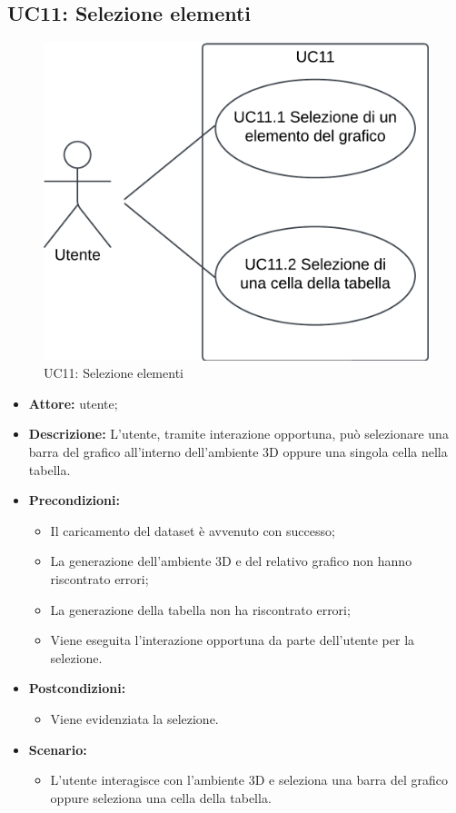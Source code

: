 \subsection{UC11: Selezione elementi}
\begin{figure}[h!]\centering
    \includegraphics[scale=0.7]{template/images/UC11.png}
    \caption{UC11: Selezione elementi}
\end{figure}
\begin{itemize}    
    \item \textbf{Attore:} utente;
    \item \textbf{Descrizione:} L'utente, tramite interazione opportuna, può selezionare una barra del grafico all'interno dell'ambiente 3D oppure una singola cella nella tabella.
    \item \textbf{Precondizioni:}    
        \begin{itemize}
            \item Il caricamento del dataset è avvenuto con successo;
            \item La generazione dell'ambiente 3D e del relativo grafico non hanno riscontrato errori;
            \item La generazione della tabella non ha riscontrato errori;
            \item Viene eseguita l'interazione opportuna da parte dell'utente per la selezione.
        \end{itemize}    
    \item \textbf{Postcondizioni:}
        \begin{itemize}
            \item Viene evidenziata la selezione.
        \end{itemize}    
    \item \textbf{Scenario:} 
        \begin{itemize}
            \item L'utente interagisce con l'ambiente 3D e seleziona una barra del grafico oppure seleziona una cella della tabella.
        \end{itemize}
\end{itemize}

